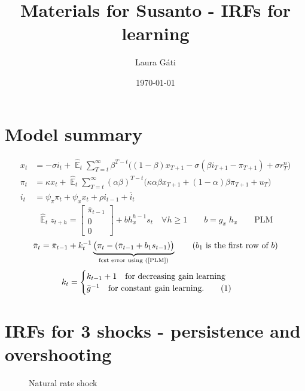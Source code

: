 \documentclass[11pt]{article}
\def \myFigPath {../figures/}
\renewcommand{\[}{\begin{equation}}
\renewcommand{\]}{\end{equation}}
\DeclareMathOperator{\E}{\mathbb{E}}
\def\myAdjustableFigScale{0.18}
\newcommand\numberthis{\addtocounter{equation}{1}\tag{\theequation}} %
\begin{document}
\linespread{1.0}

\title{Materials for Susanto - IRFs for learning}
\author{Laura G\'ati} 
\date{\today}
\maketitle


\tableofcontents



\newpage
\section{Model summary}
\begin{align}
x_t &=  -\sigma i_t +\hat{\E}_t \sum_{T=t}^{\infty} \beta^{T-t }\big( (1-\beta)x_{T+1} - \sigma(\beta i_{T+1} - \pi_{T+1}) +\sigma r_T^n \big)  \label{prestons18}  \\
\pi_t &= \kappa x_t +\hat{\E}_t \sum_{T=t}^{\infty} (\alpha\beta)^{T-t }\big( \kappa \alpha \beta x_{T+1} + (1-\alpha)\beta \pi_{T+1} + u_T\big) \label{prestons19}  \\
i_t &= \psi_{\pi}\pi_t + \psi_{x} x_t  + \rho i_{t-1} + \bar{i}_t \label{TR}
\end{align}
\begin{equation}
\hat{\E}_t z_{t+h} =  \begin{bmatrix}\bar{\pi}_{t-1} \\ 0 \\ 0 \end{bmatrix}+ bh_x^{h-1}s_t  \quad \forall h\geq 1 \quad \quad b = g_x \; h_x \quad \quad \text{PLM} \label{PLM}
\end{equation}
\begin{equation}
\bar{\pi}_{t} = \bar{\pi}_{t-1} +k_t^{-1}\underbrace{\big(\pi_{t} -(\bar{\pi}_{t-1}+b_1s_{t-1}) \big)}_{\text{fcst error using (\ref{PLM})} } \quad \quad  \text{($b_1$ is the first row of $b$)}
\end{equation}
 \begin{align*}
k_t & = \begin{cases} k_{t-1}+1 \quad \text{for decreasing gain learning}  \\ \bar{g}^{-1}  \quad \text{for constant gain learning.}\numberthis
\end{cases} 
\end{align*}


\newpage
\section{IRFs for 3 shocks - persistence and overshooting}	
\begin{figure}[h!]
\caption{Natural rate shock}
\end{figure}
\end{document}
